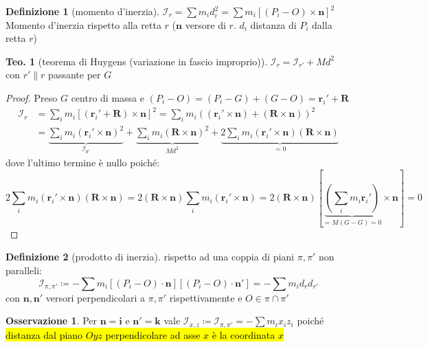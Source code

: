 \documentclass[a4paper,10pt]{article}
\theoremstyle{definition}
\newcommand{\bv}{\boldsymbol} %
\theoremstyle{indentdefinition}
\newtheorem{defn}{Definizione}[section]
\theoremstyle{indenttheorem}
\newtheorem{thm}{Teo.}
\theoremstyle{myremark}
\newtheorem*{rem*}{Osservazione}
\theoremstyle{indentgeneral}
\begin{document}
\begin{defn}[momento d'inerzia]
\label{def:momento-inerzia}$\mathcal{I}_{r}=\sum m_{i}d_{i}^{2}=\sum m_{i}\left[\left(P_{i}-O\right)\times\boldsymbol{n}\right]^{2}$
Momento d'inerzia rispetto alla retta $r$ ($\boldsymbol{n}$ versore
di $r$. $d_i$ distanza di $P_i$ dalla retta $r$)
\end{defn}

\begin{thm}[teorema di Huygens (variazione in fascio improprio)]
\label{thm:teorema-Huygens}$\mathcal{I}_{r}=\mathcal{I}_{r'}+Md^{2}$
con $r'\parallel r$ passante per $G$
\end{thm}

\begin{proof}
Preso $G$ centro di massa e $\left(P_{i}-O\right)=\left(P_{i}-G\right)+\left(G-O\right)=\bv{r}_i'+\bv{R}$
\begin{align*}
\mathcal{I}_{r} &=\sum_im_i[(\bv{r}_i'+\bv{R})\times\bv{n}]^2=\sum_im_i((\bv{r}_i'\times\bv{n})+(\bv{R}\times\bv{n}))^2 \\
&=\underbrace{\sum_im_i(\bv{r}_i'\times\bv{n})^2}_{\mathcal{I}_{\bv{r'}}}+\underbrace{\sum_im_i(\bv{R}\times\bv{n})^2}_{Md^2}+\underbrace{2\sum_im_i(\bv{r}_i'\times\bv{n})(\bv{R}\times\boldsymbol{n})}_{=0}
\end{align*}
dove l'ultimo termine è nullo poiché:
$$2\sum_im_i(\bv{r}_i'\times\bv{n})(\bv{R}\times\boldsymbol{n})=2(\bv{R}\times\boldsymbol{n})\sum_im_i(\bv{r}_i'\times\bv{n})=2(\bv{R}\times\boldsymbol{n})[\underbrace{(\sum_im_i\bv{r}_i')}_{=M(G-G)=0}\times\bv{n}]=0$$

\end{proof}
\begin{defn}[prodotto di inerzia] 
\label{def:prodotto-inerzia} rispetto ad una coppia di piani $\pi,\pi'$ non paralleli: $$\mathcal{I}_{\pi,\pi'}\coloneqq-\sum m_{i}\left[\left(P_{i}-O\right)\cdot\boldsymbol{n}\right]\left[\left(P_{i}-O\right)\cdot\boldsymbol{n}'\right]=-\sum m_id_{r}d_{r'}$$
con $\boldsymbol{n},\boldsymbol{n}'$ versori perpendicolari a $\pi,\pi'$ rispettivamente e $O\in\pi\cap\pi'$

\end{defn}

\begin{rem*}
Per $\boldsymbol{n}=\boldsymbol{i}$ e $\boldsymbol{n}'=\boldsymbol{k}$
vale $\mathcal{I}_{x,z}\coloneqq\mathcal{I}_{\pi,\pi'}=-\sum m_{i}x_{i}z_{i}$ poiché \hl{distanza dal piano $Oyz$ perpendicolare ad asse $x$ è la coordinata $x$}
\end{rem*}
\end{document}
